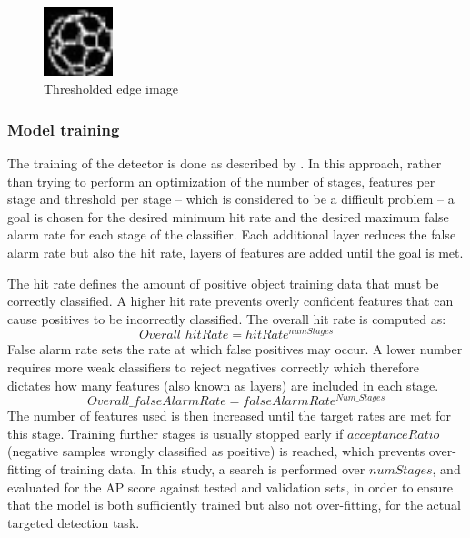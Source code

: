 \documentclass[a4paper,twoside,12pt]{report}
\begin{document}
\begin{figure}[h!]
\begin{center}
\includegraphics[width=2cm]{images/edge32.png}
\caption{Thresholded edge image}
\label{fig:edgeball}
\end{center}
\end{figure}

\subsubsection{Model training}

The training of the detector is done as described by \cite{vjdet}. In this approach, rather than trying to perform an optimization of the number of stages, features per stage and threshold per stage -- which is considered to be a difficult problem -- a goal is chosen for the desired minimum hit rate and the desired maximum false alarm rate for each stage of the classifier. Each additional layer reduces the false alarm rate but also the hit rate, layers of features are added until the goal is met.

The hit rate defines the amount of positive object training data that must be correctly classified. A higher hit rate prevents overly confident features that can cause positives to be incorrectly classified. The overall hit rate is computed as:
\begin{equation}
Overall\_hitRate = hitRate^{numStages}
\end{equation}
False alarm rate sets the rate at which false positives may occur. A lower number requires more weak classifiers to reject negatives correctly which therefore dictates how many features (also known as layers) are included in each stage. 
\begin{equation}
Overall\_falseAlarmRate = falseAlarmRate^{Num\_Stages}
\end{equation}
The number of features used is then increased until the target rates are met for this stage. Training further stages is usually stopped early if $acceptanceRatio$ (negative samples wrongly classified as positive) is reached, which prevents over-fitting of training data. In this study, a search is performed over $numStages$, and evaluated for the AP score against tested and validation sets, in order to ensure that the model is both sufficiently trained but also not over-fitting, for the actual targeted detection task.  
\end{document}

